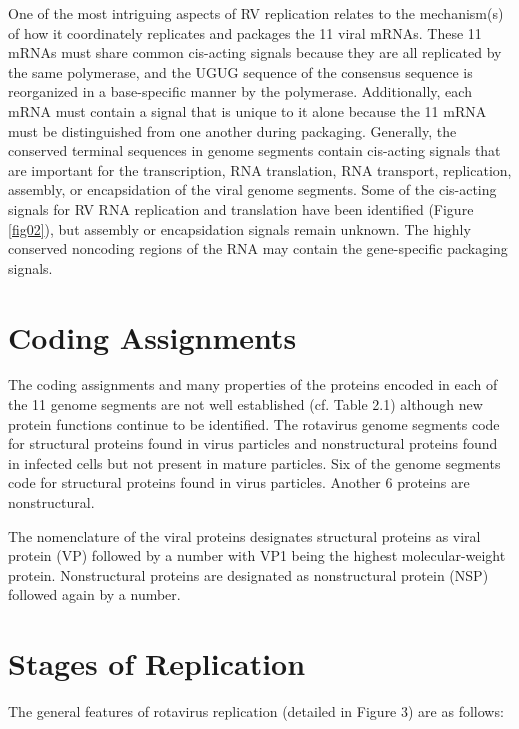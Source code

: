 One of the most intriguing aspects of RV replication relates to the mechanism(s) of how it coordinately replicates and packages the 11 viral mRNAs. These 11 mRNAs must share common cis-acting signals because they are all replicated by the same polymerase, and the UGUG sequence of the consensus sequence is reorganized in a base-specific manner by the polymerase. Additionally, each mRNA must contain a signal that is unique to it alone because the 11 mRNA must be distinguished from one another during packaging. Generally, the conserved terminal sequences in genome segments contain cis-acting signals that are important for the transcription, RNA translation, RNA transport, replication, assembly, or encapsidation of the viral genome segments. Some of the cis-acting signals for RV RNA replication and translation have been identified (Figure \ref{fig02}), but assembly or encapsidation signals remain unknown. The highly conserved noncoding regions of the RNA may contain the gene-specific packaging signals.

\section{Coding Assignments}

The coding assignments and many properties of the proteins encoded in each of the 11 genome segments are not well established (cf. Table 2.1) although new protein functions continue to be identified. The rotavirus genome segments code for structural proteins found in virus particles and nonstructural proteins found in infected cells but not present in mature particles. Six of the genome segments code for structural proteins found in virus particles. Another 6 proteins are nonstructural.

The nomenclature of the viral proteins designates structural proteins as viral protein (VP) followed by a number with VP1 being the highest molecular-weight protein. Nonstructural proteins are designated as nonstructural protein (NSP) followed again by a number.

\section{Stages of Replication}

The general features of rotavirus replication (detailed in Figure 3) are as follows:

